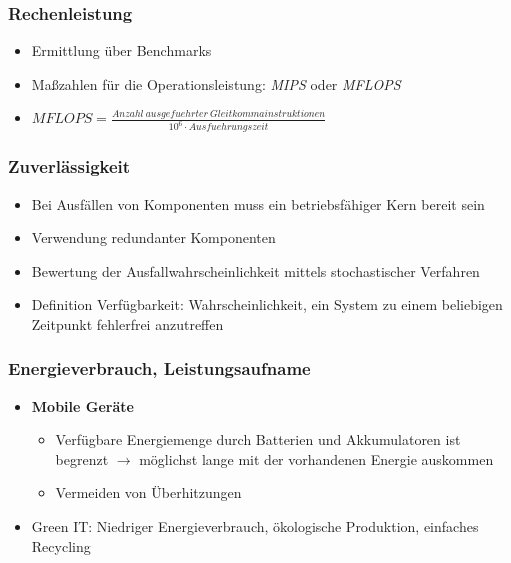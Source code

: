 \subsubsection{Rechenleistung}
\begin{itemize}
	\item Ermittlung über Benchmarks
	\item Maßzahlen für die Operationsleistung: \textit{MIPS} oder \textit{MFLOPS}
	\item \(MFLOPS = \frac{Anzahl~ausgefuehrter~Gleitkommainstruktionen}{10^6 \cdot Ausfuehrungszeit}\)
\end{itemize}

\subsubsection{Zuverlässigkeit}
\begin{itemize}
	\item Bei Ausfällen von Komponenten muss ein betriebsfähiger Kern bereit sein
	\item Verwendung redundanter Komponenten
	\item Bewertung der Ausfallwahrscheinlichkeit mittels stochastischer Verfahren
	\item Definition Verfügbarkeit: Wahrscheinlichkeit, ein System zu einem beliebigen Zeitpunkt fehlerfrei anzutreffen
\end{itemize}

\subsubsection{Energieverbrauch, Leistungsaufname}
\begin{itemize}
	\item \textbf{Mobile Geräte}
	\begin{itemize}
		\item Verfügbare Energiemenge durch Batterien und Akkumulatoren ist begrenzt \(\rightarrow\) möglichst lange mit der vorhandenen Energie auskommen
		\item Vermeiden von Überhitzungen
	\end{itemize}
	\item Green IT: Niedriger Energieverbrauch, ökologische Produktion, einfaches Recycling
\end{itemize}

